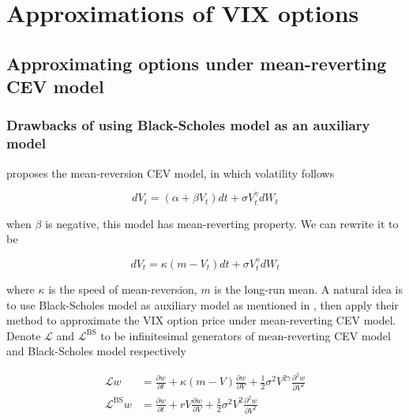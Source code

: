 \chapter{Approximations of VIX options}\label{ch3}


\section{Approximating options under mean-reverting CEV model}
\label{sec: 3.1}

\subsection{Drawbacks of using Black-Scholes model as an auxiliary model}
\cite{chan_empirical_1992} proposes the mean-reversion CEV model, in which volatility follows

$$
    d V_{t}=\left(\alpha+\beta V_{t}\right) d t+\sigma V_{t}^{\gamma} d W_{t}
$$

\noindent when $\beta$ is negative, this model has mean-reverting property. We can rewrite it to be

\begin{equation}\label{mr}
    d V_t=\kappa(m - V_t) d t+\sigma V^{\gamma}_t d W_t
\end{equation}

\noindent where $\kappa$ is the speed of mean-reversion, $m$ is the long-run mean. A natural idea is to use Black-Scholes model as auxiliary model as mentioned in \cite{kristensen_adding_2011}, then apply their method to approximate the VIX option price under mean-reverting CEV model. Denote $\mathcal{L}$ and $\mathcal{L}^{\text{BS}}$ to be infinitesimal generators of mean-reverting CEV model and Black-Scholes model respectively

$$
\begin{aligned}
    \mathcal{L} w&= \frac{\partial w}{\partial t}+\kappa(m - V) \frac{\partial w}{\partial V}+\frac{1}{2} \sigma^{2} V^{2\gamma} \frac{\partial^{2} w}{\partial V^{2}} \\
    \mathcal{L}^{\text{BS}} w &= \frac{\partial w}{\partial t}+rV \frac{\partial w}{\partial V}+\frac{1}{2} \sigma^{2} V^2 \frac{\partial^{2} w}{\partial V^{2}}
\end{aligned}
$$

